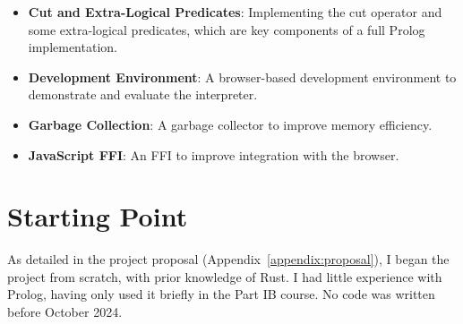 \begin{itemize}
\setlength{\itemsep}{0em}
\item \textbf{Cut and Extra-Logical Predicates}: Implementing the cut operator and some extra-logical predicates, which are key components of a full Prolog implementation.
\item \textbf{Development Environment}: A browser-based development environment to demonstrate and evaluate the interpreter.
\item \textbf{Garbage Collection}: A garbage collector to improve memory efficiency.
\item \textbf{JavaScript FFI}: An FFI to improve integration with the browser.
\end{itemize}

\section{Starting Point}

\label{sec:starting-point}

As detailed in the project proposal (Appendix~\ref{appendix:proposal}), I began the project from scratch, with prior knowledge of Rust. I had little experience with Prolog, having only used it briefly in the Part IB course. No code was written before October 2024.